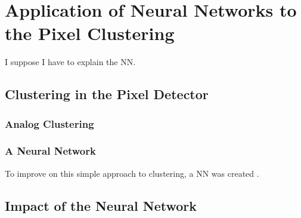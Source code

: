 
\chapter{Application of Neural Networks to the Pixel Clustering} %

\label{ch:nn} %


I suppose I have to explain the NN.


\section{Clustering in the Pixel Detector}

\subsection{Analog Clustering}

\subsection{A Neural Network}

To improve on this simple approach to clustering, a \ac{NN} was created \cite{ATL-PHYS-PUB-2015-052}.

\section{Impact of the Neural Network}